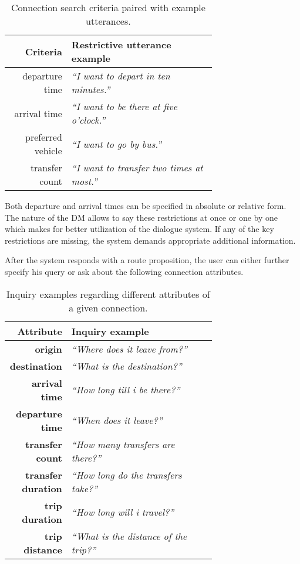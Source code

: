 \begin{table}[h]
\centering
\begin{tabular}{ r | p{0.7\linewidth} }
	Criteria & Restrictive utterance example \\ \hline
	departure time & \textit{``I want to depart in ten minutes.''} \\
	arrival time & \textit{``I want to be there at five o'clock.''} \\
	preferred vehicle & \textit{``I want to go by bus.''} \\
	transfer count & \textit{``I want to transfer two times at most.''}
\end{tabular}
\caption[Restrictive criteria specification]{Connection search criteria paired with example utterances.}
\label{table:attributes}
\end{table}

Both departure and arrival times can be specified in absolute or relative form.
The nature of the DM allows to say these restrictions at once or one by one which makes for better utilization of the dialogue system.
If any of the key restrictions are missing, the system demands appropriate additional information.

After the system responds with a route proposition, the user can either further specify his query or ask about the following connection attributes.

\begin{table}[h]
\centering
\begin{tabular}{ r | p{0.7\linewidth} }
	Attribute & Inquiry example \\ \hline
	\textbf{origin} & \textit{``Where does it leave from?''} \\
	\textbf{destination} & \textit{``What is the destination?''} \\
	\textbf{arrival time} & \textit{``How long till i be there?''} \\
	\textbf{departure time} & \textit{``When does it leave?''} \\
	\textbf{transfer count} & \textit{``How many transfers are there?''} \\
	\textbf{transfer duration} & \textit{``How long do the transfers take?''} \\
	\textbf{trip duration} & \textit{``How long will i travel?''} \\
	\textbf{trip distance} & \textit{``What is the distance of the trip?''}
\end{tabular}
\caption[Details about provided connection]{Inquiry examples regarding different attributes of a given connection.}
\label{table:attributes}
\end{table}

